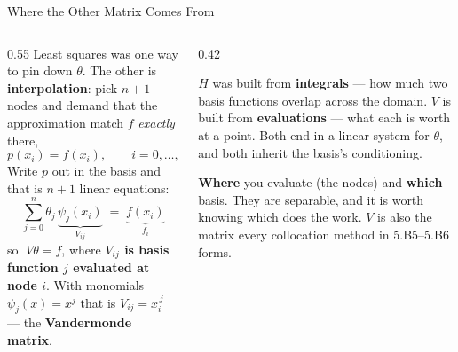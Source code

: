 \begin{frame}{Where the Other Matrix Comes From}
\begin{columns}[T]
\begin{column}{0.55\textwidth}
\small
Least squares was one way to pin down $\theta$. The other is \textbf{interpolation}: pick $n+1$ nodes
and demand that the approximation match $f$ \emph{exactly} there,
\[
  p(x_i)=f(x_i),\qquad i=0,\dots,n .
\]
Write $p$ out in the basis and that is $n+1$ linear equations:
\[
  \sum_{j=0}^{n}\theta_j\,\underbrace{\psi_j(x_i)}_{\textstyle V_{ij}}
  \;=\;\underbrace{f(x_i)}_{\textstyle f_i}
\]
so $\;V\theta=f$, where \textbf{$V_{ij}$ is basis function $j$ evaluated at node $i$}. With monomials
$\psi_j(x)=x^{j}$ that is $V_{ij}=x_i^{\,j}$ --- the \textbf{Vandermonde matrix}.
\end{column}
\begin{column}{0.42\textwidth}
\begin{conceptbox}[title=\textbf{Two matrices, one question}]\footnotesize
$H$ was built from \textbf{integrals} --- how much two basis functions overlap across the domain.
$V$ is built from \textbf{evaluations} --- what each is worth at a point. Both end in a linear system
for $\theta$, and both inherit the basis's conditioning.
\end{conceptbox}
\medskip
\begin{examplebox}[title=\textbf{$V$ hides two choices}]\footnotesize
\textbf{Where} you evaluate (the nodes) and \textbf{which} basis. They are separable, and it is worth
knowing which does the work. $V$ is also the matrix every collocation method in 5.B5--5.B6 forms.
\end{examplebox}
\end{column}
\end{columns}
\vspace{1mm}
\end{frame}

